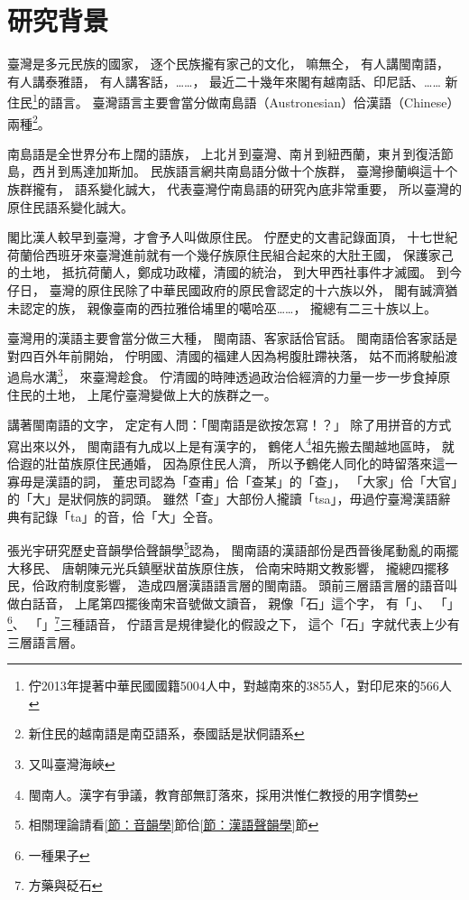 \chapter{研究背景}
\label{章：研究背景}
臺灣是多元民族的國家，
逐个民族攏有家己的文化，
嘛無仝，
有人講閩南語，
有人講泰雅語，
有人講客話，……，
最近二十幾年來閣有越南話、印尼話、……
新住民\footnote{佇2013年提著中華民國國籍5004人中，對越南來的3855人，對印尼來的566人\cite{國籍之歸化取得人數}}的語言。
臺灣語言主要會當分做南島語（Austronesian）佮漢語（Chinese）兩種\footnote{新住民的越南語是南亞語系，泰國話是狀侗語系}。

南島語是全世界分布上闊的語族\cite{臺灣原住民史李壬癸}，
上北爿到臺灣、南爿到紐西蘭，東爿到復活節島，西爿到馬達加斯加。
民族語言網\cite{Ethnologue}共南島語分做十个族群，
臺灣摻蘭嶼這十个族群攏有，
語系變化誠大，
代表臺灣佇南島語的研究內底非常重要，
所以臺灣的原住民語系變化誠大。

閣比漢人較早到臺灣，才會予人叫做原住民。
佇歷史的文書記錄面頂，
十七世紀荷蘭佮西班牙來臺灣進前就有一个幾仔族原住民組合起來的大肚王國\cite{中研院民族所數位典藏大肚番王傳奇}，
保護家己的土地，
抵抗荷蘭人，鄭成功政權，清國的統治，
到大甲西社事件才滅國。
到今仔日，
臺灣的原住民除了中華民國政府的原民會認定的十六族以外，
閣有誠濟猶未認定的族，
親像臺南的西拉雅佮埔里的噶哈巫……，
攏總有二三十族以上。

臺灣用的漢語主要會當分做三大種，
閩南語、客家話佮官話\cite{外省族群的母語與國語}。
閩南語佮客家話是對四百外年前開始，
佇明國、清國的福建人因為枵腹肚蹛袂落，
姑不而將駛船渡過烏水溝\footnote{又叫臺灣海峽}，
來臺灣趁食。
佇清國的時陣透過政治佮經濟的力量一步一步食掉原住民的土地，
上尾佇臺灣變做上大的族群之一。

講著閩南語的文字，
定定有人問：「閩南語是欲按怎寫！？」
除了用拼音的方式寫出來以外，
閩南語有九成以上是有漢字的\cite{洪惟仁閩南語九成有漢字}，
鶴佬人\footnote{閩南人。漢字有爭議，教育部無訂落來，採用洪惟仁教授的用字慣勢}祖先搬去閩越地區時，
就佮遐的壯苗族原住民通婚，
因為原住民人濟，
所以予鶴佬人同化的時留落來這一寡毋是漢語的詞，
董忠司\cite{董忠司非漢語初探}認為「查甫」佮「查某」的「查」，
「大家」佮「大官」的「大」是狀侗族的詞頭。
雖然「查」大部份人攏讀「tsa」，毋過佇臺灣漢語辭典\cite{臺灣漢語辭典}有記錄「ta」的音，佮「大」仝音。

張光宇\cite{閩客方言史稿}研究歷史音韻學佮聲韻學\footnote{相關理論請看\ref{節：音韻學}節佮\ref{節：漢語聲韻學}節}認為，
閩南語的漢語部份是西晉後尾動亂的兩擺大移民、
唐朝陳元光兵鎮壓狀苗族原住族，
佮南宋時期文教影響，
攏總四擺移民，佮政府制度影響，
造成四層漢語語言層的閩南語。
頭前三層語言層的語音叫做白話音，
上尾第四擺後南宋音號做文讀音，
親像「石」這个字，
有「」、
「」\footnote{一種果子}、
「」\footnote{方藥與砭石}三種語音，
佇語言是規律變化的假設之下，
這个「石」字就代表上少有三層語言層。

